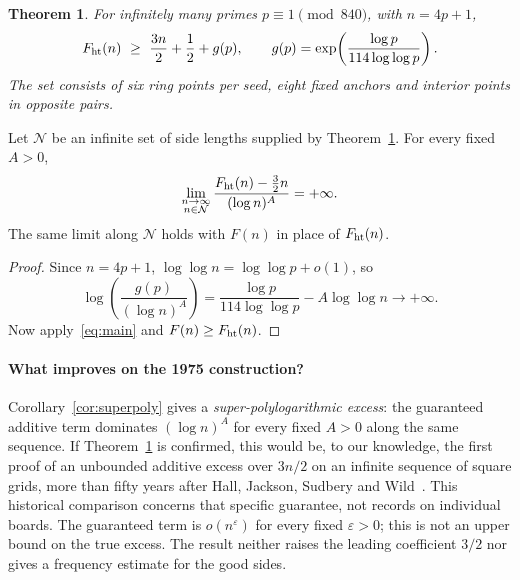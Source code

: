 \documentclass[11pt]{article}
\newtheorem{theorem}{Theorem}[section]
\newcommand{\mathcopy}[2]{\ifdefined\pdfliteral
  \pdfliteral direct{/Span << /ActualText <\pdfescapehex{\detokenize{#1}}> >> BDC}#2\pdfliteral direct{EMC}%
  \else#2\fi}
\begin{document}
\begin{theorem}\label{thm:main}
For infinitely many primes $p\equiv1\pmod{840}$, with $n=4p+1$,
\begin{equation}\label{eq:main}
 \mathcopy{F_ht(n) >= 3n/2 + 1/2 + g(p), where g(p) = exp(log(p)/(114 log(log(p)))).}{\htf(n)\ \ge\ \frac{3n}{2}+\frac12+g(p),
 \qquad g(p)=\exp\!\left(\frac{\log p}{114\log\log p}\right).}
\end{equation}
The set consists of six ring points per seed, eight fixed anchors and interior points in opposite pairs.
\end{theorem}
\begin{corollary}\label{cor:superpoly}
Let $\mathcal N$ be an infinite set of side lengths supplied by Theorem~\ref{thm:main}. For every fixed $A>0$,
\[
  \mathcopy{lim (n -> infinity, n in N) (F_ht(n) - 3n/2) / (log n)^A = +infinity.}{\lim_{\substack{n\to\infty\\n\in\mathcal N}} \frac{\htf(n)-\tfrac32 n}{(\log n)^A}=+\infty.}
\]
The same limit along $\mathcal N$ holds with $F(n)$ in place of $F_{\mathrm{ht}}(n)$.
\end{corollary}
\begin{proof} Since $n=4p+1$, $\log\log n=\log\log p+o(1)$, so
\[
  \log\!\left(\frac{g(p)}{(\log n)^A}\right)
  =\frac{\log p}{114\log\log p}-A\log\log n\longrightarrow+\infty.
\]
Now apply~\eqref{eq:main} and $F(n)\ge F_{\mathrm{ht}}(n)$.
\end{proof}
\paragraph{What improves on the 1975 construction?} Corollary~\ref{cor:superpoly} gives a \emph{super-polylogarithmic excess}: the guaranteed additive term dominates $(\log n)^A$ for every fixed $A>0$ along the same sequence. If Theorem~\ref{thm:main} is confirmed, this would be, to our knowledge, the first proof of an unbounded additive excess over $3n/2$ on an infinite sequence of square grids, more than fifty years after Hall, Jackson, Sudbery and Wild~\cite{hjsw}. This historical comparison concerns that specific guarantee, not records on individual boards. The guaranteed term is $o(n^\varepsilon)$ for every fixed $\varepsilon>0$; this is not an upper bound on the true excess. The result neither raises the leading coefficient $3/2$ nor gives a frequency estimate for the good sides.
\end{document}
